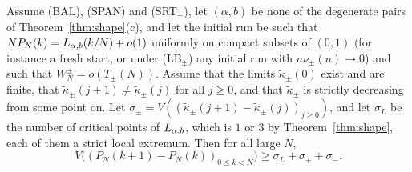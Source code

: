 \begin{theorem}\label{thm:signs}
Assume (BAL), (SPAN) and (SRT$_\pm$), let $(\alpha,b)$ be none of the degenerate pairs of
Theorem~\ref{thm:shape}(c), and let the initial run be such that $NP_N(k)=L_{\alpha,b}(k/N)+o(1)$ uniformly on compact subsets of $(0,1)$ (for instance a fresh
start, or under (LB$_\pm$) any initial run with $n\nu_\pm(n)\to0$) and such that
$W^\pm_N=o(T_\pm(N))$. Assume that the limits $\widetilde\kappa_\pm(0)$ exist and are finite,
that $\widetilde\kappa_\pm(j+1)\ne\widetilde\kappa_\pm(j)$ for all $j\ge0$, and that
$\widetilde\kappa_\pm$ is strictly decreasing from some point on. Let
$\sigma_\pm=V((\widetilde\kappa_\pm(j+1)-\widetilde\kappa_\pm(j))_{j\ge0})$, and let $\sigma_L$ be the
number of critical points of $L_{\alpha,b}$, which is $1$ or $3$ by Theorem~\ref{thm:shape}, each of
them a strict local extremum. Then for all large $N$,
\[
 V\bigl((P_N(k+1)-P_N(k))_{0\le k<N}\bigr)\ge\sigma_L+\sigma_\plus+\sigma_\minus .
\]
\end{theorem}

